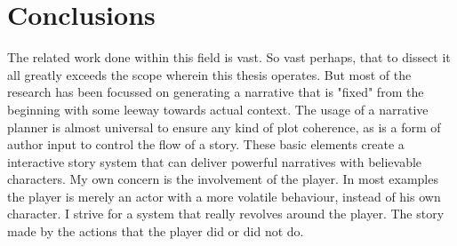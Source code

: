 \section{Conclusions}
The related work done within this field is vast. So vast perhaps, that to dissect it all greatly exceeds the scope wherein this thesis operates. But most of the research has been focussed on generating a narrative that is "fixed" from the beginning with some leeway towards actual context. The usage of a narrative planner is almost universal to ensure any kind of plot coherence, as is a form of author input to control the flow of a story. These basic elements create a interactive story system that can deliver powerful narratives with believable characters. My own concern is the involvement of the player. In most examples the player is merely an actor with a more volatile behaviour, instead of his own character. I strive for a system that really revolves around the player. The story made by the actions that the player did or did not do. 




